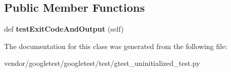 \subsection*{Public Member Functions}
\begin{DoxyCompactItemize}
\item 
def {\bfseries test\+Exit\+Code\+And\+Output} (self)\hypertarget{classgtest__uninitialized__test_1_1GTestUninitializedTest_ace4bbad0abec476b03a91bb453e6451c}{}\label{classgtest__uninitialized__test_1_1GTestUninitializedTest_ace4bbad0abec476b03a91bb453e6451c}

\end{DoxyCompactItemize}


The documentation for this class was generated from the following file\+:\begin{DoxyCompactItemize}
\item 
vendor/googletest/googletest/test/gtest\+\_\+uninitialized\+\_\+test.\+py\end{DoxyCompactItemize}
